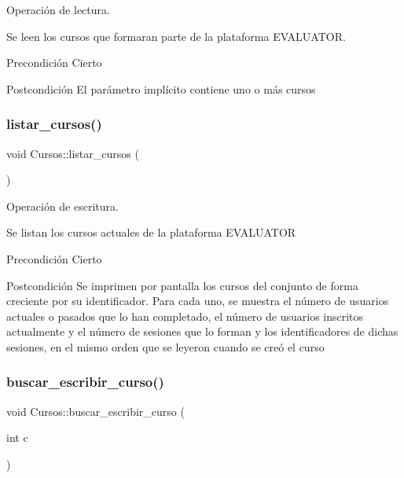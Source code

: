Operación de lectura. 

Se leen los cursos que formaran parte de la plataforma E\+V\+A\+L\+U\+A\+T\+OR. \begin{DoxyPrecond}{Precondición}
Cierto 
\end{DoxyPrecond}
\begin{DoxyPostcond}{Postcondición}
El parámetro implícito contiene uno o más cursos 
\end{DoxyPostcond}
\mbox{\label{class_cursos_aeb29e1a1c81d4bbe0537653a0a6bbc08}} 
\subsubsection{\texorpdfstring{listar\+\_\+cursos()}{listar\_cursos()}}
{\footnotesize\ttfamily void Cursos\+::listar\+\_\+cursos (\begin{DoxyParamCaption}{ }\end{DoxyParamCaption})}



Operación de escritura. 

Se listan los cursos actuales de la plataforma E\+V\+A\+L\+U\+A\+T\+OR \begin{DoxyPrecond}{Precondición}
Cierto 
\end{DoxyPrecond}
\begin{DoxyPostcond}{Postcondición}
Se imprimen por pantalla los cursos del conjunto de forma creciente por su identificador. Para cada uno, se muestra el número de usuarios actuales o pasados que lo han completado, el número de usuarios inscritos actualmente y el número de sesiones que lo forman y los identificadores de dichas sesiones, en el mismo orden que se leyeron cuando se creó el curso 
\end{DoxyPostcond}
\mbox{\label{class_cursos_af870c77c0a43615e18d4f7c5db30c49f}} 
\subsubsection{\texorpdfstring{buscar\+\_\+escribir\+\_\+curso()}{buscar\_escribir\_curso()}}
{\footnotesize\ttfamily void Cursos\+::buscar\+\_\+escribir\+\_\+curso (\begin{DoxyParamCaption}\item[{int}]{c }\end{DoxyParamCaption})}



